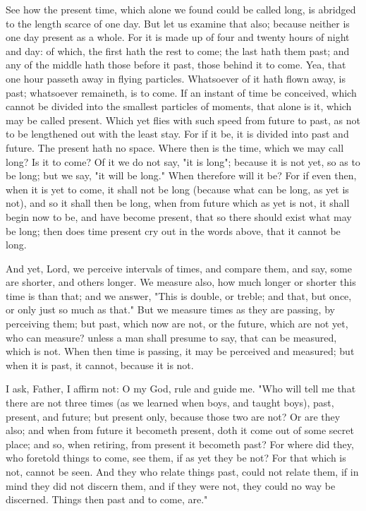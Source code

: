 \documentclass[b5paper,openright,12pt,twoside]{book}
\begin{document}
See how the present time, which alone we found could be called long, is
abridged to the length scarce of one day. But let us examine that also;
because neither is one day present as a whole. For it is made up of four
and twenty hours of night and day: of which, the first hath the rest to
come; the last hath them past; and any of the middle hath those before
it past, those behind it to come. Yea, that one hour passeth away in
flying particles. Whatsoever of it hath flown away, is past; whatsoever
remaineth, is to come. If an instant of time be conceived, which cannot
be divided into the smallest particles of moments, that alone is it,
which may be called present. Which yet flies with such speed from future
to past, as not to be lengthened out with the least stay. For if it be,
it is divided into past and future. The present hath no space. Where
then is the time, which we may call long? Is it to come? Of it we do not
say, "it is long"; because it is not yet, so as to be long; but we say,
"it will be long." When therefore will it be? For if even then, when it
is yet to come, it shall not be long (because what can be long, as yet
is not), and so it shall then be long, when from future which as yet is
not, it shall begin now to be, and have become present, that so there
should exist what may be long; then does time present cry out in the
words above, that it cannot be long.

And yet, Lord, we perceive intervals of times, and compare them, and
say, some are shorter, and others longer. We measure also, how much
longer or shorter this time is than that; and we answer, "This is
double, or treble; and that, but once, or only just so much as that."
But we measure times as they are passing, by perceiving them; but past,
which now are not, or the future, which are not yet, who can measure?
unless a man shall presume to say, that can be measured, which is not.
When then time is passing, it may be perceived and measured; but when it
is past, it cannot, because it is not.

I ask, Father, I affirm not: O my God, rule and guide me. "Who will tell
me that there are not three times (as we learned when boys, and taught
boys), past, present, and future; but present only, because those two
are not? Or are they also; and when from future it becometh present,
doth it come out of some secret place; and so, when retiring, from
present it becometh past? For where did they, who foretold things to
come, see them, if as yet they be not? For that which is not, cannot be
seen. And they who relate things past, could not relate them, if in mind
they did not discern them, and if they were not, they could no way be
discerned. Things then past and to come, are."
\end{document}
